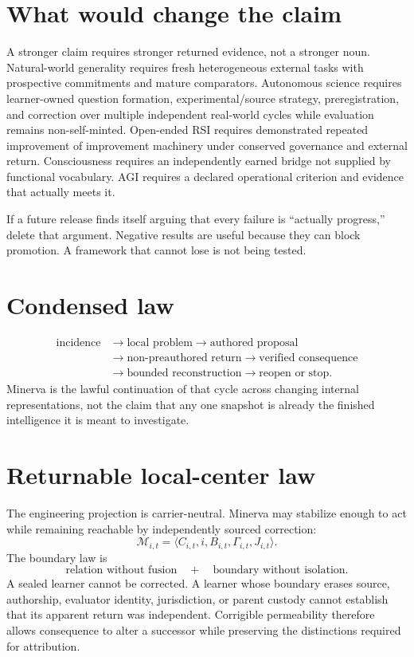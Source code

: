 \documentclass[11pt]{article}
\begin{document}
\section{What would change the claim}
A stronger claim requires stronger returned evidence, not a stronger noun.
Natural-world generality requires fresh heterogeneous external tasks with
prospective commitments and mature comparators. Autonomous science requires
learner-owned question formation, experimental/source strategy, preregistration,
and correction over multiple independent real-world cycles while evaluation
remains non-self-minted. Open-ended RSI requires demonstrated repeated
improvement of improvement machinery under conserved governance and external
return. Consciousness requires an independently earned bridge not supplied by
functional vocabulary. AGI requires a declared operational criterion and evidence
that actually meets it.

\begin{devilbox}
If a future release finds itself arguing that every failure is ``actually
progress,'' delete that argument. Negative results are useful because they can
block promotion. A framework that cannot lose is not being tested.
\end{devilbox}

\section{Condensed law}
\begin{equation}
\boxed{\begin{aligned}
\text{incidence}&\to\text{local problem}\to\text{authored proposal}\\
&\to\text{non-preauthored return}\to\text{verified consequence}\\
&\to\text{bounded reconstruction}\to\text{reopen or stop}.
\end{aligned}}
\end{equation}
Minerva is the lawful continuation of that cycle across changing internal
representations, not the claim that any one snapshot is already the finished
intelligence it is meant to investigate.


\section{Returnable local-center law}

The engineering projection is carrier-neutral.  Minerva may stabilize enough to
act while remaining reachable by independently sourced correction:
\[
\mathcal M_{i,t}
=
\langle C_{i,t},i,B_{i,t},\Gamma_{i,t},J_{i,t}\rangle .
\]
The boundary law is
\[
\boxed{
\text{relation without fusion}
\quad+\quad
\text{boundary without isolation}.
}
\]
A sealed learner cannot be corrected.  A learner whose boundary erases source,
authorship, evaluator identity, jurisdiction, or parent custody cannot establish
that its apparent return was independent.  Corrigible permeability therefore
allows consequence to alter a successor while preserving the distinctions
required for attribution.
\end{document}
